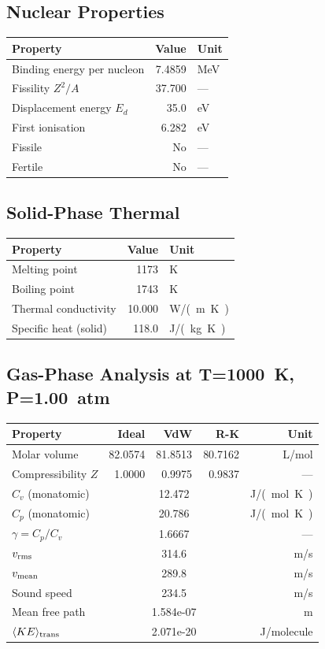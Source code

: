 \documentclass[11pt,a4paper]{article}
\begin{document}
\subsection{Nuclear Properties}
\begin{tabular}{lrl}
  \toprule
  Property & Value & Unit \\
  \midrule
  Binding energy per nucleon & 7.4859 & \si{MeV} \\
  Fissility $Z^2/A$ & 37.700 & --- \\
  Displacement energy $E_d$ & 35.0 & \si{eV} \\
  First ionisation & 6.282 & \si{eV} \\
  Fissile & No & --- \\
  Fertile & No & --- \\
  \bottomrule
\end{tabular}

\subsection{Solid-Phase Thermal}
\begin{tabular}{lrl}
  \toprule
  Property & Value & Unit \\
  \midrule
  Melting point & 1173 & \si{K} \\
  Boiling point & 1743 & \si{K} \\
  Thermal conductivity & 10.000 & \si{W/(m.K)} \\
  Specific heat (solid) & 118.0 & \si{J/(kg.K)} \\
  \bottomrule
\end{tabular}

\subsection{Gas-Phase Analysis at T=\SI{1000}{K}, P=\SI{1.00}{atm}}
\begin{tabular}{lrrrr}
  \toprule
  Property & Ideal & VdW & R-K & Unit \\
  \midrule
  Molar volume & 82.0574 & 81.8513 & 80.7162 & \si{L/mol} \\
  Compressibility $Z$ & 1.0000 & 0.9975 & 0.9837 & --- \\
  \midrule
  $C_v$ (monatomic) & \multicolumn{3}{c}{12.472} & \si{J/(mol.K)} \\
  $C_p$ (monatomic) & \multicolumn{3}{c}{20.786} & \si{J/(mol.K)} \\
  $\gamma = C_p/C_v$ & \multicolumn{3}{c}{1.6667} & --- \\
  $v_{\rm rms}$ & \multicolumn{3}{c}{314.6} & \si{m/s} \\
  $v_{\rm mean}$ & \multicolumn{3}{c}{289.8} & \si{m/s} \\
  Sound speed & \multicolumn{3}{c}{234.5} & \si{m/s} \\
  Mean free path & \multicolumn{3}{c}{1.584e-07} & \si{m} \\
  $\langle KE \rangle_{\rm trans}$ & \multicolumn{3}{c}{2.071e-20} & \si{J/molecule} \\
  \bottomrule
\end{tabular}
\end{document}
